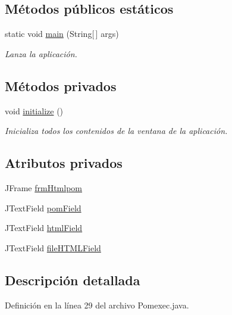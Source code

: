 \subsection*{Métodos públicos estáticos}
\begin{DoxyCompactItemize}
\item 
static void \mbox{\hyperlink{a00029_a52ecabe81c9c3180cdccb3749b6553d6}{main}} (String\mbox{[}$\,$\mbox{]} args)
\begin{DoxyCompactList}\small\item\em Lanza la aplicación. \end{DoxyCompactList}\end{DoxyCompactItemize}
\subsection*{Métodos privados}
\begin{DoxyCompactItemize}
\item 
void \mbox{\hyperlink{a00029_ab89003495509c2f11da18c9675828571}{initialize}} ()
\begin{DoxyCompactList}\small\item\em Inicializa todos los contenidos de la ventana de la aplicación. \end{DoxyCompactList}\end{DoxyCompactItemize}
\subsection*{Atributos privados}
\begin{DoxyCompactItemize}
\item 
J\+Frame \mbox{\hyperlink{a00029_a1927e599316cd24b73c1148e28cb0532}{frm\+Htmlpom}}
\item 
J\+Text\+Field \mbox{\hyperlink{a00029_a7ea71ef0b61fa8df0b1689d11ce167cf}{pom\+Field}}
\item 
J\+Text\+Field \mbox{\hyperlink{a00029_a70bdb1d4b3b75dab759706ce0d85c9cf}{html\+Field}}
\item 
J\+Text\+Field \mbox{\hyperlink{a00029_ac458a48643144b5728bb22fdace1dada}{file\+H\+T\+M\+L\+Field}}
\end{DoxyCompactItemize}


\subsection{Descripción detallada}


Definición en la línea 29 del archivo Pomexec.\+java.



